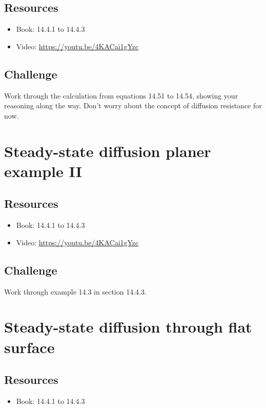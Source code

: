 \subsection*{Resources}
\begin{itemize}
    \item Book: 14.4.1 to 14.4.3
    \item Video: \url{https://youtu.be/4KACai1gYzc}
\end{itemize}

\subsection*{Challenge}
Work through the calculation from equations 14.51 to 14.54, showing your reasoning along the way. Don't worry about the concept of diffusion resistance for now.




\newpage
\section{Steady-state diffusion planer example II}

\subsection*{Resources}
\begin{itemize}
    \item Book: 14.4.1 to 14.4.3
    \item Video: \url{https://youtu.be/4KACai1gYzc}
\end{itemize}

\subsection*{Challenge}
Work through example 14.3 in section 14.4.3.




\newpage
\section{Steady-state diffusion through flat surface}

\subsection*{Resources}
\begin{itemize}
    \item Book: 14.4.1 to 14.4.3
\end{itemize}

